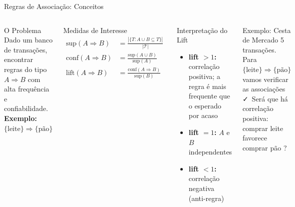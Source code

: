 \documentclass[aspectratio=169]{beamer}
\begin{document}
\begin{frame}[shrink=5]{Regras de Associação: Conceitos}
    \begin{columns}
        \begin{block}{O Problema}
            \footnotesize
            Dado um banco de transações, encontrar regras do tipo $A \Rightarrow B$ com alta frequência e confiabilidade.\\[4pt]
            \textbf{Exemplo:} $\{\text{leite}\} \Rightarrow \{\text{pão}\}$
        \end{block}
        \begin{block}{Medidas de Interesse}
            \footnotesize
            \begin{align*}
              \text{sup}(A{\Rightarrow}B) &= \tfrac{|\{T: A\cup B\subseteq T\}|}{|\mathcal{T}|}\\
              \text{conf}(A{\Rightarrow}B) &= \tfrac{\text{sup}(A\cup B)}{\text{sup}(A)}\\
              \text{lift}(A{\Rightarrow}B) &= \tfrac{\text{conf}(A\Rightarrow B)}{\text{sup}(B)}
            \end{align*}
        \end{block}
        \begin{block}{Interpretação do Lift}
            \begin{itemize}\footnotesize
                \item \textbf{lift $> 1$:} correlação positiva; a regra é mais frequente que o esperado por acaso
                \item \textbf{lift $= 1$:} $A$ e $B$ independentes
                \item \textbf{lift $< 1$:} correlação negativa (anti-regra)
            \end{itemize}
        \end{block}
        \begin{block}{Exemplo: Cesta de Mercado}
            \footnotesize
            5 transações. Para $\{\text{leite}\} \Rightarrow \{\text{pão}\}$ vamos verificar as associações
            \faCheck\ Será que há correlação positiva: comprar leite favorece comprar pão ?
        \end{block}
    \end{columns}
\end{frame}
\end{document}
